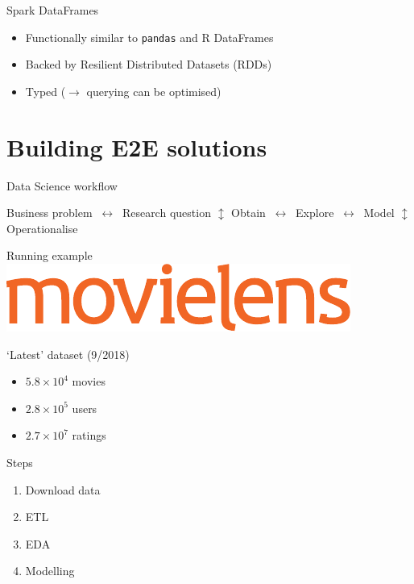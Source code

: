 \documentclass[12pt,aspectratio=169]{beamer}
\begin{document}
\begin{frame}{Spark DataFrames}
    \begin{itemize}
        \setlength{\itemsep}{\bigskipamount}%
        \item Functionally similar to \texttt{pandas} and R DataFrames
        \item Backed by Resilient Distributed Datasets (RDDs)
        \item Typed ($\to$ querying can be optimised)
    \end{itemize}
\end{frame}

\section{Building E2E solutions}

\begin{frame}{Data Science workflow}
    \begin{center}
        \large%
        Business problem $\ \longleftrightarrow\ $ Research question
        \vfill
        $\updownarrow$
        \vfill
        Obtain $\ \longleftrightarrow\ $ Explore $\ \longleftrightarrow\ $ Model
        \vfill
        $\updownarrow$
        \vfill
        Operationalise
    \end{center}
\end{frame}

\begin{frame}{Running example}
    \includegraphics[height=2ex]{figures/movielens}
    \begin{block}{`Latest' dataset (9/2018)}
        \begin{itemize}
            \item $5.8 \times 10^{4}$ movies
            \item $2.8 \times 10^{5}$ users
            \item $2.7 \times 10^{7}$ ratings
        \end{itemize}
    \end{block}
\end{frame}

\begin{frame}{Steps}
    \begin{enumerate}
        \setlength{\itemsep}{\bigskipamount}%
        \item Download data
        \item ETL
        \item EDA
        \item Modelling
    \end{enumerate}
\end{frame}
\end{document}
